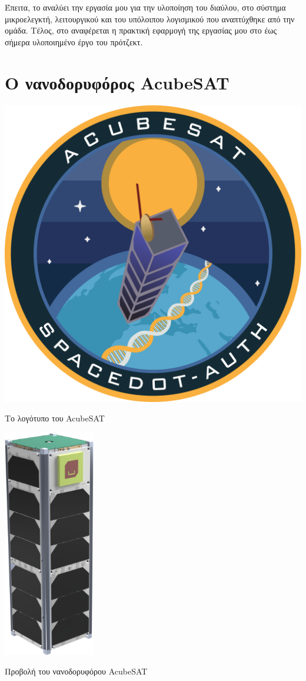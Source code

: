 \documentclass[a4paper,nobib,justified]{tufte-book}
\begin{document}
\par Έπειτα, το  αναλύει την εργασία μου για την υλοποίηση του διαύλου, στο σύστημα μικροελεγκτή, λειτουργικού και του υπόλοιπου λογισμικού που αναπτύχθηκε από την ομάδα. Τέλος, στο  αναφέρεται η πρακτική εφαρμογή της εργασίας μου στο έως σήμερα υλοποιημένο έργο του πρότζεκτ.

\chapter{Ο νανοδορυφόρος AcubeSAT}
\label{chap:acubesat}

\begin{marginfigure}
	\centering
	\includegraphics{media/acubesat_patch.pdf}
	\caption{Το λογότυπο του AcubeSAT}
	\label{acubesat-logo}

	\includegraphics[height=10cm]{media/images/acubesat.png}
	\caption{Προβολή του νανοδορυφόρου AcubeSAT}
	\label{acubesat-render}
\end{marginfigure}
\end{document}
